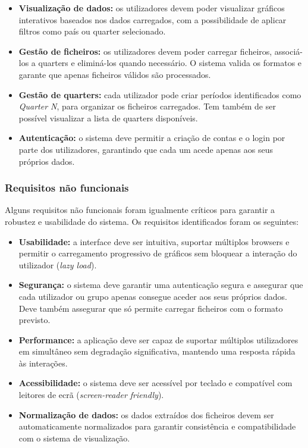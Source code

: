 \begin{itemize}
    \item \textbf{Visualização de dados:} os utilizadores devem poder visualizar gráficos interativos baseados nos dados carregados, com a possibilidade de aplicar filtros como país ou quarter selecionado.

    \item \textbf{Gestão de ficheiros:} os utilizadores devem poder carregar ficheiros, associá-los a quarters e eliminá-los quando necessário. O sistema valida os formatos e garante que apenas ficheiros válidos são processados.
    
    \item \textbf{Gestão de quarters:} cada utilizador pode criar períodos identificados como \textit{Quarter N}, para organizar os ficheiros carregados. Tem também de ser possível visualizar a lista de quarters disponíveis.

    \item \textbf{Autenticação:} o sistema deve permitir a criação de contas e o login por parte dos utilizadores, garantindo que cada um acede apenas aos seus próprios dados.
    
\end{itemize}

\subsubsection{Requisitos não funcionais}

Alguns requisitos não funcionais foram igualmente críticos para garantir a robustez e usabilidade do sistema. Os requisitos identificados foram os seguintes:

\begin{itemize}
    \item \textbf{Usabilidade:} a interface deve ser intuitiva, suportar múltiplos browsers e permitir o carregamento progressivo de gráficos sem bloquear a interação do utilizador (\textit{lazy load}).
    
    \item \textbf{Segurança:} o sistema deve garantir uma autenticação segura e assegurar que cada utilizador ou grupo apenas consegue aceder aos seus próprios dados. Deve também assegurar que só permite carregar ficheiros com o formato previsto.
    
    \item \textbf{Performance:} a aplicação deve ser capaz de suportar múltiplos utilizadores em simultâneo sem degradação significativa, mantendo uma resposta rápida às interações.
    
    \item \textbf{Acessibilidade:} o sistema deve ser acessível por teclado e compatível com leitores de ecrã (\textit{screen-reader friendly}).

    \item \textbf{Normalização de dados:} os dados extraídos dos ficheiros devem ser automaticamente normalizados para garantir consistência e compatibilidade com o sistema de visualização.

\end{itemize}

